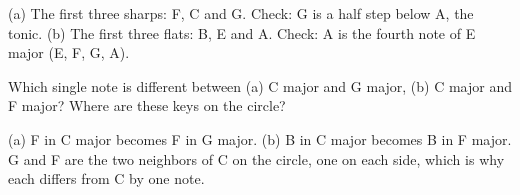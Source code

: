 \begin{answerbox}
(a) The first three sharps: F\sh, C\sh{} and G\sh. Check: G\sh{} is a half step below A, the tonic. (b) The first three flats: B\fl, E\fl{} and A\fl. Check: A\fl{} is the fourth note of E\fl{} major (E\fl, F, G, A\fl).
\end{answerbox}

\begin{exercise}
Which single note is different between (a) C major and G major, (b) C major and F major? Where are these keys on the circle?
\end{exercise}

\begin{answerbox}
(a) F in C major becomes F\sh{} in G major. (b) B in C major becomes B\fl{} in F major. G and F are the two neighbors of C on the circle, one on each side, which is why each differs from C by one note.
\end{answerbox}
